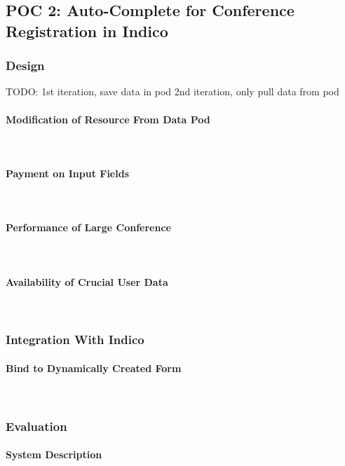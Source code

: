 \subsection{POC 2: Auto-Complete for Conference Registration in Indico}

\subsubsection{Design}

TODO:
1st iteration, save data in pod
2nd iteration, only pull data from pod

\paragraph{Modification of Resource From Data Pod}\mbox{}\\

\paragraph{Payment on Input Fields}\mbox{}\\

\paragraph{Performance of Large Conference}\mbox{}\\

\paragraph{Availability of Crucial User Data}\mbox{}\\

\subsubsection{Integration With Indico}

\paragraph{Bind to Dynamically Created Form}\mbox{}\\

\subsubsection{Evaluation}

\paragraph{System Description}\mbox{}\\
